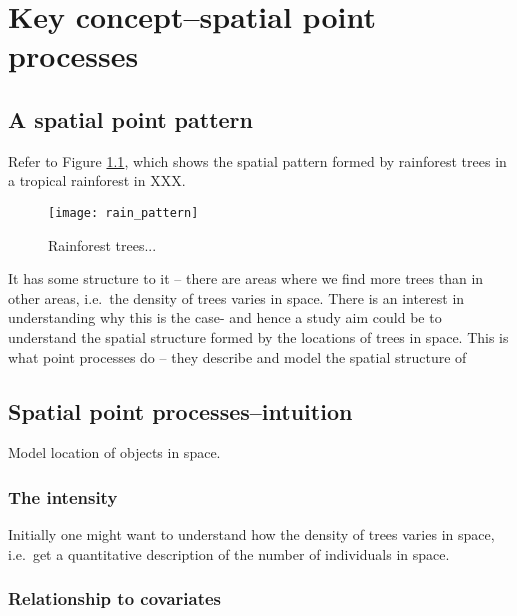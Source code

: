 \chapter{Key concept--spatial point processes}


\section{A spatial point pattern}

Refer to Figure \ref{fig:rainpattern2}, which shows the spatial pattern formed by rainforest trees in a tropical rainforest in XXX. 

\begin{figure}
\centering
\texttt{[image: rain\_pattern]}
\caption{\label{fig:rainpattern2} Rainforest trees...}
\end{figure}

It has some structure to it -- there are areas where we find more trees than in other areas, i.e.\ the density of trees varies in space. There is an interest in understanding why this is the case- and hence a study aim could be to understand the spatial structure formed by the locations of trees in space.
This is what point processes do -- they describe and model the spatial structure of 
 
\section{Spatial point processes--intuition}
Model location of objects in space.

\subsection{The intensity}
Initially one might want to understand how the density of trees varies in space, i.e.\ get a quantitative description of the number of individuals in space.

\subsection{Relationship to covariates}

\subsection{}


